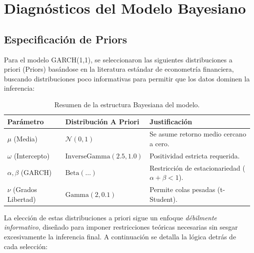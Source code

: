 

\section{Diagnósticos del Modelo Bayesiano}
\label{app:diagnosticos}

\subsection{Especificación de Priors}

Para el modelo GARCH(1,1), se seleccionaron las siguientes distribuciones a priori (Priors) basándose en la literatura estándar de econometría financiera, buscando distribuciones poco informativas para permitir que los datos dominen la inferencia:

\begin{table}[h]
    \centering
    \begin{tabular}{llp{6cm}}
        \toprule
        \textbf{Parámetro} & \textbf{Distribución A Priori} & \textbf{Justificación} \\
        \midrule
        $\mu$ (Media) & $\mathcal{N}(0, 1)$ & Se asume retorno medio cercano a cero. \\
        $\omega$ (Intercepto) & $\text{InverseGamma}(2.5, 1.0)$ & Positividad estricta requerida. \\
        $\alpha, \beta$ (GARCH) & $\text{Beta}(\dots)$ & Restricción de estacionariedad ($\alpha + \beta < 1$). \\
        $\nu$ (Grados Libertad) & $\text{Gamma}(2, 0.1)$ & Permite colas pesadas (t-Student). \\
        \bottomrule
    \end{tabular}
    \caption{Resumen de la estructura Bayesiana del modelo.}
    \label{tab:priors}
\end{table}

\noindent La elección de estas distribuciones a priori sigue un enfoque \textit{débilmente informativo}, diseñado para imponer restricciones teóricas necesarias sin sesgar excesivamente la inferencia final. A continuación se detalla la lógica detrás de cada selección:

